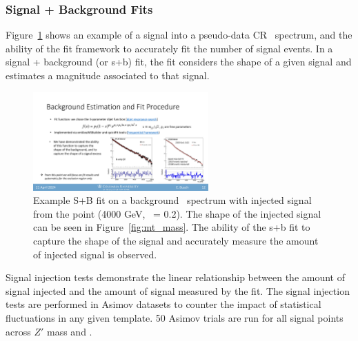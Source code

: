 \clearpage
\subsubsection{Signal + Background Fits}
\label{subsec:fit_splusb}

Figure~\ref{fig:splusb_sigInj} shows an example of a signal into a pseudo-data CR \mt~spectrum, and the ability of the fit framework to accurately fit the number of signal events.
In a signal + background (or s+b) fit, the fit considers the shape of a given signal and estimates a magnitude associated to that signal.

\begin{figure}[!htbp]
\centering
   \includegraphics[width=0.6\textwidth]{figures/stats/splusb_sigInj}
    \caption{Example S+B fit on a background \mt~spectrum with injected signal from the point (4000 GeV, \rinv~= 0.2). The shape of the injected signal can be seen in Figure~\ref{fig:mt_mass}. The ability of the s+b fit to capture the shape of the signal and accurately measure the amount of injected signal is observed.
    \label{fig:splusb_sigInj}}
\end{figure}

Signal injection tests demonstrate the linear relationship between the amount of signal injected and the amount of signal measured by the fit.
The signal injection tests are performed in Asimov datasets to counter the impact of statistical fluctuations in any given template.
50 Asimov trials are run for all signal points across $Z'$ mass and \rinv.


